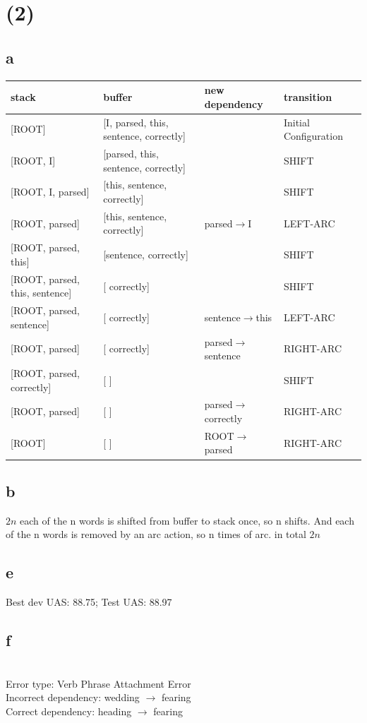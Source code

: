 \documentclass[12pt]{article}
\begin{document}
\section*{(2)}
\subsection*{a}

\begin{tabular}{llll}
\hline
stack & buffer & new dependency & transition \\
\hline
{[ROOT]} & [I, parsed, this, sentence, correctly] & & Initial Configuration \\
{[ROOT, I]} & [parsed, this, sentence, correctly] & & SHIFT \\
{[ROOT, I, parsed]} & [this, sentence, correctly] & & SHIFT \\
{[ROOT, parsed]} & [this, sentence, correctly] & parsed$\to$I & LEFT-ARC \\
{[ROOT, parsed, this]} & [sentence, correctly] & & SHIFT \\
{[ROOT, parsed, this, sentence]} & [ correctly] & & SHIFT \\
{[ROOT, parsed,  sentence]} & [ correctly] & sentence$\to$this&  LEFT-ARC \\
{[ROOT, parsed]} & [ correctly] & parsed$\to$sentence&  RIGHT-ARC \\
{[ROOT, parsed, correctly]} & [ ] & & SHIFT \\
{[ROOT, parsed]} & [ ] & parsed$\to$correctly & RIGHT-ARC \\
{[ROOT]} & [ ] & ROOT$\to$parsed & RIGHT-ARC \\
\hline
\end{tabular}
\subsection*{b}
$2n$ each of the n words is shifted from buffer to stack once, so n shifts. And each of the n words is removed by an arc action, so n times of arc. in total $2n$
\subsection*{e}
Best dev UAS: 88.75; 
Test UAS: 88.97
\subsection*{f}
\noindent \textbf{}\\
Error type: Verb Phrase Attachment Error \\
Incorrect dependency: wedding $\to$ fearing \\
Correct dependency: heading $\to$ fearing \\
\end{document}
